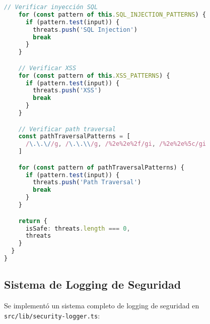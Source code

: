 \documentclass[12pt,a4paper]{article}
\begin{document}
\begin{lstlisting}[language=TypeScript, caption=Validador de Entrada]
    // Verificar inyección SQL
    for (const pattern of this.SQL_INJECTION_PATTERNS) {
      if (pattern.test(input)) {
        threats.push('SQL Injection')
        break
      }
    }

    // Verificar XSS
    for (const pattern of this.XSS_PATTERNS) {
      if (pattern.test(input)) {
        threats.push('XSS')
        break
      }
    }

    // Verificar path traversal
    const pathTraversalPatterns = [
      /\.\.\//g, /\.\.\\/g, /%2e%2e%2f/gi, /%2e%2e%5c/gi
    ]

    for (const pattern of pathTraversalPatterns) {
      if (pattern.test(input)) {
        threats.push('Path Traversal')
        break
      }
    }

    return {
      isSafe: threats.length === 0,
      threats
    }
  }
}
\end{lstlisting}

\subsection{Sistema de Logging de Seguridad}

Se implementó un sistema completo de logging de seguridad en \texttt{src/lib/security-logger.ts}:
\end{document}
